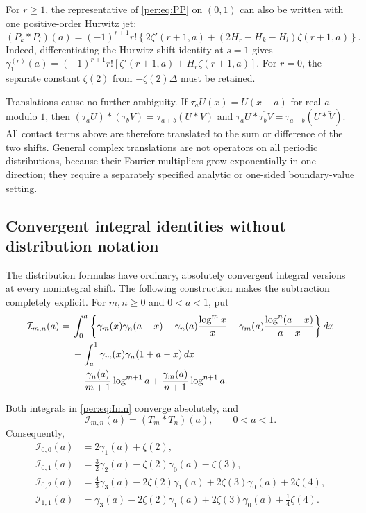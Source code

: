 For $r\ge1$, the representative of \eqref{per:eq:PP} on $(0,1)$ can
also be written with one positive-order Hurwitz jet:
\begin{equation}\label{per:eq:PPordinary}
 (P_k*P_l)(a)=(-1)^{r+1}r!
 \left\{2\zeta'(r+1,a)+(2H_r-H_k-H_l)\zeta(r+1,a)\right\}.
\end{equation}
Indeed, differentiating the Hurwitz shift identity at $s=1$ gives
$\gamma_1^{(r)}(a)=(-1)^{r+1}r![\zeta'(r+1,a)+H_r\zeta(r+1,a)]$.
For $r=0$, the separate constant $\zeta(2)$ from $-\zeta(2)\Delta$
must be retained.

Translations cause no further ambiguity. If
$\tau_aU(x)=U(x-a)$ for real $a$ modulo $1$, then
$(\tau_aU)*(\tau_bV)=\tau_{a+b}(U*V)$ and
$\tau_aU*\check{\tau_bV}=\tau_{a-b}(U*\check V)$.
All contact terms above are therefore translated to the sum or difference
of the two shifts. General complex translations are not operators on all
periodic distributions, because their Fourier multipliers grow
exponentially in one direction; they require a separately specified
analytic or one-sided boundary-value setting.

\subsection{Convergent integral identities without distribution notation}

The distribution formulas have ordinary, absolutely convergent integral
versions at every nonintegral shift. The following construction makes
the subtraction completely explicit. For $m,n\ge0$ and $0<a<1$, put
\begin{align}
 \mathcal I_{m,n}(a)={}&
 \int_0^a\left\{\gamma_m(x)\gamma_n(a-x)
       -\gamma_n(a)\frac{\log^m x}{x}
       -\gamma_m(a)\frac{\log^n(a-x)}{a-x}\right\}dx\notag\\
 &+\int_a^1\gamma_m(x)\gamma_n(1+a-x)\,dx\notag\\
 &+\frac{\gamma_n(a)}{m+1}\log^{m+1}a
       +\frac{\gamma_m(a)}{n+1}\log^{n+1}a.
 \label{per:eq:Imn}
\end{align}

\begin{proposition}
\label{per:prop:Imn}
Both integrals in \eqref{per:eq:Imn} converge absolutely, and
\[
 \mathcal I_{m,n}(a)=(T_m*T_n)(a),\qquad 0<a<1.
\]
Consequently,
\begin{align}
 \mathcal I_{0,0}(a)&=2\gamma_1(a)+\zeta(2),
 \label{per:eq:I00}\\
 \mathcal I_{0,1}(a)&=\frac32\gamma_2(a)-\zeta(2)\gamma_0(a)-\zeta(3),
 \label{per:eq:I01}\\
 \mathcal I_{0,2}(a)&=\frac43\gamma_3(a)-2\zeta(2)\gamma_1(a)
                         +2\zeta(3)\gamma_0(a)+2\zeta(4),
 \label{per:eq:I02}\\
 \mathcal I_{1,1}(a)&=\gamma_3(a)-2\zeta(2)\gamma_1(a)
                         +2\zeta(3)\gamma_0(a)+\frac14\zeta(4).
 \label{per:eq:I11}
\end{align}
\end{proposition}

